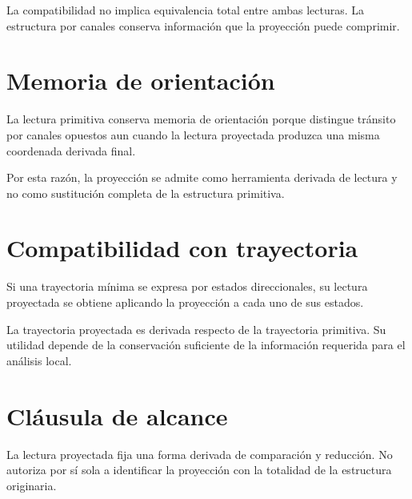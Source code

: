 \begin{observation}
La compatibilidad no implica equivalencia total entre ambas lecturas. La estructura por canales conserva información que la proyección puede comprimir.
\end{observation}

\section{Memoria de orientación}
\begin{observation}
La lectura primitiva conserva memoria de orientación porque distingue tránsito por canales opuestos aun cuando la lectura proyectada produzca una misma coordenada derivada final.
\end{observation}

\begin{observation}
Por esta razón, la proyección se admite como herramienta derivada de lectura y no como sustitución completa de la estructura primitiva.
\end{observation}

\section{Compatibilidad con trayectoria}
\begin{definition}
Si una trayectoria mínima se expresa por estados direccionales, su lectura proyectada se obtiene aplicando la proyección a cada uno de sus estados.
\end{definition}

\begin{observation}
La trayectoria proyectada es derivada respecto de la trayectoria primitiva. Su utilidad depende de la conservación suficiente de la información requerida para el análisis local.
\end{observation}

\section{Cláusula de alcance}
\begin{observation}
La lectura proyectada fija una forma derivada de comparación y reducción. No autoriza por sí sola a identificar la proyección con la totalidad de la estructura originaria.
\end{observation}

